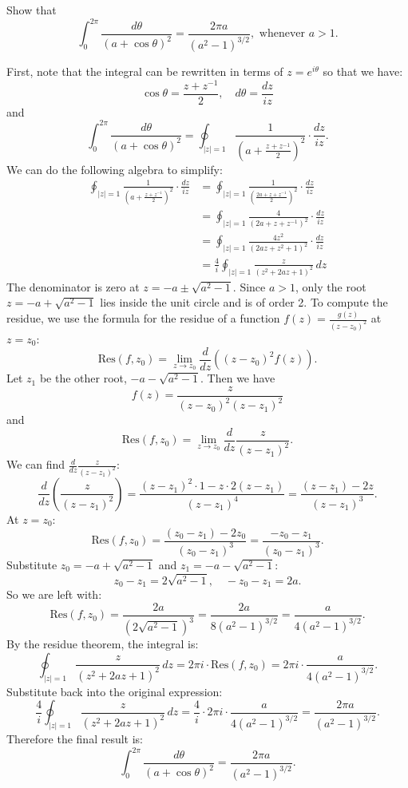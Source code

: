 \documentclass[12pt]{article}
\begin{document}
\begin{statement}[7]
  Show that 
  $$ \int^{2 \pi}_{0} \frac{d \theta}{(a+ \cos \theta)^2} = 
  \frac{2\pi a }{(a^2-1)^{3/2}}, \text{ whenever } a > 1. $$
\end{statement}
\begin{newproof}
    First, note that the integral can be rewritten in terms of $z = e^{i\theta}$ so that we have:
    $$ \cos \theta = \frac{z + z^{-1}}{2}, \quad d\theta = \frac{dz}{iz} $$
    and 
    $$ \int^{2\pi}_{0} \frac{d\theta}{(a + \cos \theta)^2} = \oint_{|z|=1} \frac{1}{\left(a + \frac{z + z^{-1}}{2}\right)^2} \cdot \frac{dz}{iz}. $$
    We can do the following algebra to simplify:
    \begin{align*}
        \oint_{|z|=1} \frac{1}{\left(a + \frac{z + z^{-1}}{2}\right)^2} \cdot \frac{dz}{iz} &= \oint_{|z|=1} \frac{1}{\left(\frac{2a + z + z^{-1}}{2}\right)^2} \cdot \frac{dz}{iz} \\
        &= \oint_{|z|=1} \frac{4}{(2a + z + z^{-1})^2} \cdot \frac{dz}{iz} \\
        &= \oint_{|z|=1} \frac{4z^2}{(2a z + z^2 + 1)^2} \cdot \frac{dz}{iz} \\
        &= \frac{4}{i} \oint_{|z|=1} \frac{z}{(z^2 + 2a z + 1)^2} \, dz
    \end{align*}
    The denominator is zero at $z = -a \pm \sqrt{a^2 - 1}$. 
    Since $a > 1$, only the root $z = -a + \sqrt{a^2 - 1}$ lies inside the unit circle and is of order 2. To compute the residue, we use the formula for the residue of a function $f(z) = \frac{g(z)}{(z - z_0)^2}$ at $z = z_0$:
    $$ \text{Res}(f, z_0) = \lim_{z \to z_0} \frac{d}{dz} \left( (z - z_0)^2 f(z) \right). $$
    Let $z_1$ be the other root, $-a - \sqrt{a^2 - 1}$. Then we have 
    $$ f(z)=\frac{z}{(z-z_0)^2(z-z_1)^2} $$
    and 
    $$ \text{Res}(f,z_0)=\lim_{z \to z_0} \frac{d}{dz} \frac{z}{(z-z_1)^2}. $$
    We can find $\frac{d}{dz} \frac{z}{(z-z_1)^2}$:
    $$ \frac{d}{dz} \left( \frac{z}{(z - z_1)^2} \right) = \frac{(z - z_1)^2 \cdot 1 - z \cdot 2(z - z_1)}{(z - z_1)^4} = \frac{(z - z_1) - 2z}{(z - z_1)^3}. $$
    At $z = z_0$:
    $$ \text{Res}(f, z_0) = \frac{(z_0 - z_1) - 2z_0}{(z_0 - z_1)^3} = \frac{-z_0 - z_1}{(z_0 - z_1)^3}. $$
    Substitute $z_0 = -a + \sqrt{a^2 - 1}$ and $z_1 = -a - \sqrt{a^2 - 1}$:
    $$ z_0 - z_1 = 2\sqrt{a^2 - 1}, \quad -z_0 - z_1 = 2a. $$
    So we are left with:
    $$ \text{Res}(f, z_0) = \frac{2a}{(2\sqrt{a^2 - 1})^3} = \frac{2a}{8(a^2 - 1)^{3/2}} = \frac{a}{4(a^2 - 1)^{3/2}}. $$
    By the residue theorem, the integral is:
    $$ \oint_{|z|=1} \frac{z}{(z^2 + 2a z + 1)^2} \, dz = 2\pi i \cdot \text{Res}(f, z_0) = 2\pi i \cdot \frac{a}{4(a^2 - 1)^{3/2}}. $$ 
    Substitute back into the original expression:
    $$ \frac{4}{i} \oint_{|z|=1} \frac{z}{(z^2 + 2a z + 1)^2} \, dz = \frac{4}{i} \cdot 2\pi i \cdot \frac{a}{4(a^2 - 1)^{3/2}} = \frac{2\pi a}{(a^2 - 1)^{3/2}}. $$
    Therefore the final result is:
    $$ \int^{2\pi}_{0} \frac{d\theta}{(a + \cos \theta)^2} = \frac{2\pi a}{(a^2 - 1)^{3/2}}. $$
\end{newproof}
\end{document}
